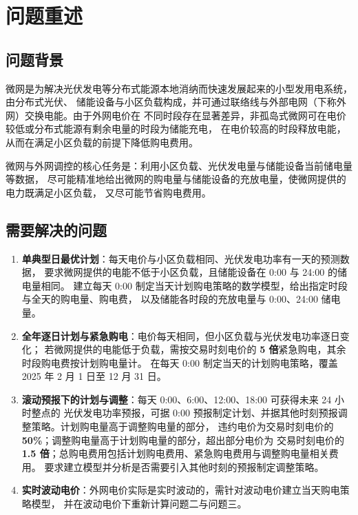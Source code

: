\documentclass[12pt,a4paper,fontset=fandol]{ctexart}
\begin{document}
\section{问题重述}

\subsection{问题背景}

微网是为解决光伏发电等分布式能源本地消纳而快速发展起来的小型发用电系统\nobreak，由分布式光伏\nobreak、
储能设备与小区负载构成\nobreak，并可通过联络线与外部电网（下称外网\nobreak）交换电能\nobreak。由于外网电价在
不同时段存在显著差异\nobreak，非孤岛式微网可在电价较低或分布式能源有剩余电量的时段为储能充电\nobreak，
在电价较高的时段释放电能\nobreak，从而在满足小区负载的前提下降低购电费用\nobreak。

微网与外网调控的核心任务是\nobreak：利用小区负载\nobreak、光伏发电量与储能设备当前储电量等数据\nobreak，
尽可能精准地给出微网的购电量与储能设备的充放电量\nobreak，使微网提供的电力既满足小区负载\nobreak，
又尽可能节省购电费用\nobreak。

\subsection{需要解决的问题}

\begin{enumerate}[label=\textbf{问题\arabic*.}, leftmargin=4em, itemsep=2pt]
\item \textbf{单典型日最优计划}\nobreak：每天电价与小区负载相同\nobreak、光伏发电功率有一天的预测数据\nobreak，
要求微网提供的电能不低于小区负载\nobreak，且储能设备在 0:00 与 24:00 的储电量相同\nobreak。
建立每天 0:00 制定当天计划购电策略的数学模型\nobreak，给出指定时段与全天的购电量\nobreak、购电费\nobreak，
以及储能各时段的充放电量与 0:00\nobreak、24:00 储电量\nobreak。
\item \textbf{全年逐日计划与紧急购电}\nobreak：电价每天相同\nobreak，但小区负载与光伏发电功率逐日变化\nobreak；
若微网提供的电能低于负载\nobreak，需按交易时刻电价的 \textbf{5 倍}紧急购电\nobreak，其余时段购电费按计划购电量计\nobreak。
在每天 0:00 制定当天的计划购电策略\nobreak，覆盖 2025 年 2 月 1 日至 12 月 31 日\nobreak。
\item \textbf{滚动预报下的计划与调整}\nobreak：每天 0:00\nobreak、6:00\nobreak、12:00\nobreak、18:00 可获得未来 24 小时整点的
光伏发电功率预报\nobreak，可据 0:00 预报制定计划\nobreak、并据其他时刻预报调整策略\nobreak。计划购电量高于调整购电量的部分\nobreak，
违约电价为交易时刻电价的 \textbf{50\%}\nobreak；调整购电量高于计划购电量的部分\nobreak，超出部分电价为
交易时刻电价的 \textbf{1.5 倍}\nobreak；总购电费用包括计划购电费用\nobreak、紧急购电费用与调整购电量相关费用\nobreak。
要求建立模型并分析是否需要引入其他时刻的预报制定调整策略\nobreak。
\item \textbf{实时波动电价}\nobreak：外网电价实际是实时波动的\nobreak，需针对波动电价建立当天购电策略模型\nobreak，
并在波动电价下重新计算问题二与问题三\nobreak。
\end{enumerate}
\end{document}

